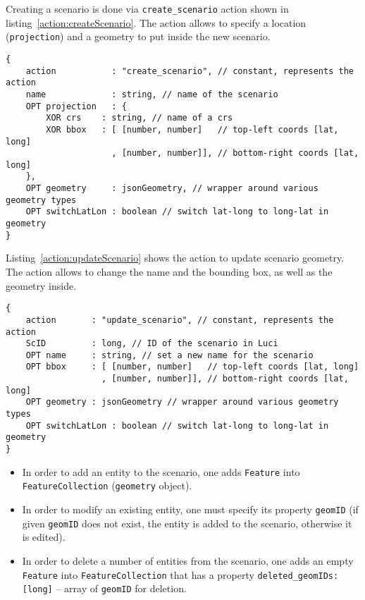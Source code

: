 \documentclass[pdftex,11pt,a4paper]{article} %
\begin{document}
Creating a scenario is done
via \texttt{create\_scenario} action shown in listing~\ref{action:createScenario}.
The action allows to specify a location (\texttt{projection}) and a geometry to put inside the new scenario.
\begin{lstlisting}[caption={JSON action structure for creating a scenario in \ac{Luci}}, label={action:createScenario}]
{
	action           : "create_scenario", // constant, represents the action
	name             : string, // name of the scenario
	OPT projection   : {
		XOR crs    : string, // name of a crs
		XOR bbox   : [ [number, number]   // top-left coords [lat, long]
		             , [number, number]], // bottom-right coords [lat, long]
	},
	OPT geometry     : jsonGeometry, // wrapper around various geometry types
	OPT switchLatLon : boolean // switch lat-long to long-lat in geometry
}
\end{lstlisting}


Listing~\ref{action:updateScenario} shows the action to update scenario geometry.
The action allows to change the name and the bounding box, as well as the geometry inside.
\begin{lstlisting}[caption={JSON action structure for updating a scenario in \ac{Luci}}, label={action:updateScenario}]
{
	action       : "update_scenario", // constant, represents the action
	ScID         : long, // ID of the scenario in Luci
	OPT name     : string, // set a new name for the scenario
	OPT bbox     : [ [number, number]   // top-left coords [lat, long]
	               , [number, number]], // bottom-right coords [lat, long]
	OPT geometry : jsonGeometry // wrapper around various geometry types
	OPT switchLatLon : boolean // switch lat-long to long-lat in geometry
}
\end{lstlisting}
\begin{itemize}
\item In order to add an entity to the scenario, one adds \texttt{Feature} into \texttt{FeatureCollection} (\texttt{geometry} object).
\item In order to modify an existing entity, one must specify its property \texttt{geomID} (if given \texttt{geomID} does not exist, the entity is added to the scenario, otherwise it is edited).
\item In order to delete a number of entities from the scenario, one adds an empty \texttt{Feature} into \texttt{FeatureCollection} that has a property \texttt{deleted\_geomIDs:[\color{blue}long\color{black}]} -- array of \texttt{geomID} for deletion.
\end{itemize}
\end{document}
